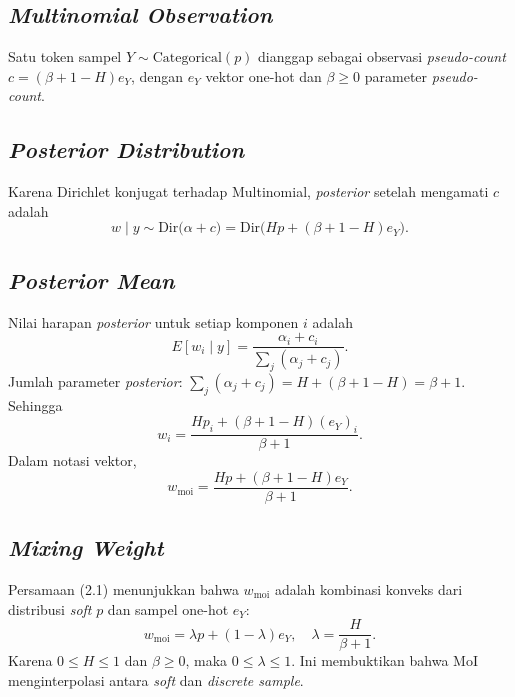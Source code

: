 \subsection{\textit{Multinomial Observation}}
Satu token sampel \(Y \sim \text{Categorical}(p)\) dianggap sebagai observasi \textit{pseudo-count} \(c = (\beta + 1 - H) e_Y\), dengan \(e_Y\) vektor one-hot dan \(\beta \ge 0\) parameter \textit{pseudo-count}.

\subsection{\textit{Posterior Distribution}}
Karena Dirichlet konjugat terhadap Multinomial, \textit{posterior} setelah mengamati \(c\) adalah
\begin{equation}
w \mid y \sim \text{Dir}\big(\alpha + c\big) = \text{Dir}\big(Hp + (\beta+1-H)e_Y\big).
\end{equation}

\subsection{\textit{Posterior Mean}}
Nilai harapan \textit{posterior} untuk setiap komponen \(i\) adalah
\begin{equation}
E[w_i \mid y] = \frac{\alpha_i + c_i}{\sum_j (\alpha_j + c_j)}.
\end{equation}
Jumlah parameter \textit{posterior}: \(\sum_j (\alpha_j + c_j) = H + (\beta+1-H) = \beta+1\). Sehingga
\begin{equation}
\boxed{ w_i = \frac{H p_i + (\beta+1-H) (e_Y)_i}{\beta+1} }.
\end{equation}
Dalam notasi vektor,
\begin{equation}
\boxed{ w_{\mathrm{moi}} = \frac{H p + (\beta+1-H) e_Y}{\beta+1} }.
\tag{2.1}
\end{equation}

\subsection{\textit{Mixing Weight}}
Persamaan (2.1) menunjukkan bahwa \(w_{\mathrm{moi}}\) adalah kombinasi konveks dari distribusi \textit{soft} \(p\) dan sampel one-hot \(e_Y\):
\begin{equation}
w_{\mathrm{moi}} = \lambda p + (1-\lambda) e_Y, \quad \lambda = \frac{H}{\beta+1}.
\end{equation}
Karena \(0\le H \le 1\) dan \(\beta\ge 0\), maka \(0\le \lambda \le 1\). Ini membuktikan bahwa MoI menginterpolasi antara \textit{soft} dan \textit{discrete sample}.

